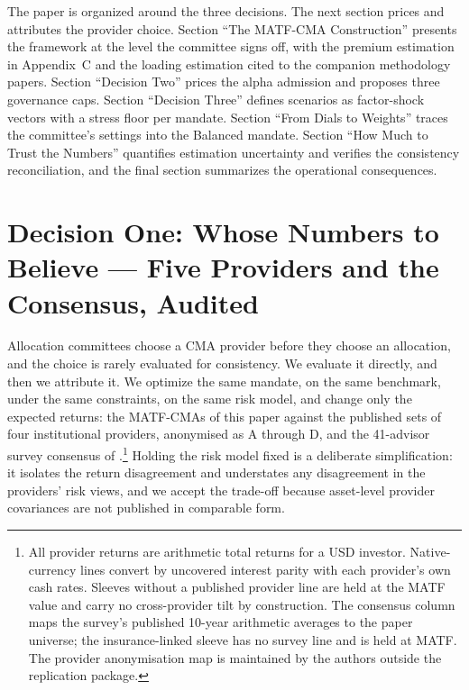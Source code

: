 \documentclass[pdftex,12pt,a4paper]{article}
\begin{document}
The paper is organized around the three decisions. The next section prices and attributes the provider choice. Section ``The MATF-CMA Construction'' presents the framework at the level the committee signs off, with the premium estimation in Appendix~C and the loading estimation cited to the companion methodology papers. Section ``Decision Two'' prices the alpha admission and proposes three governance caps. Section ``Decision Three'' defines scenarios as factor-shock vectors with a stress floor per mandate. Section ``From Dials to Weights'' traces the committee's settings into the Balanced mandate. Section ``How Much to Trust the Numbers'' quantifies estimation uncertainty and verifies the consistency reconciliation, and the final section summarizes the operational consequences.


\sectionfont{\MakeUppercase}
\section*{Decision One: Whose Numbers to Believe --- Five Providers and the Consensus, Audited}\label{sec:provider}

Allocation committees choose a CMA provider before they choose an allocation, and the choice is rarely evaluated for consistency. We evaluate it directly, and then we attribute it. We optimize the same mandate, on the same benchmark, under the same constraints, on the same risk model, and change only the expected returns: the MATF-CMAs of this paper against the published sets of four institutional providers, anonymised as A through D, and the 41-advisor survey consensus of \citet{HorizonSurvey2025}.\footnote{All provider returns are arithmetic total returns for a USD investor. Native-currency lines convert by uncovered interest parity with each provider's own cash rates. Sleeves without a published provider line are held at the MATF value and carry no cross-provider tilt by construction. The consensus column maps the survey's published 10-year arithmetic averages to the paper universe; the insurance-linked sleeve has no survey line and is held at MATF. The provider anonymisation map is maintained by the authors outside the replication package.} Holding the risk model fixed is a deliberate simplification: it isolates the return disagreement and understates any disagreement in the providers' risk views, and we accept the trade-off because asset-level provider covariances are not published in comparable form.
\end{document}
